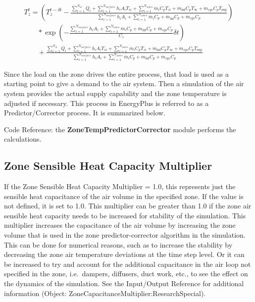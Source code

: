 \begin{equation}
\begin{array}{l}T_z^t = \left( {T_z^{t - \delta t} - \frac{{\sum\limits_{i = 1}^{{N_{sl}}} {{{\dot Q}_i}}  + \sum\limits_{i = 1}^{{N_{surfaces}}} {{h_i}} {A_i}{T_{si}} + \sum\limits_{i = 1}^{{N_{zones}}} {{{\dot m}_i}} {C_p}{T_{zi}} + {{\dot m}_{\inf }}{C_p}{T_\infty } + {{\dot m}_{sys}}{C_p}{T_{\sup }}}}{{\sum\limits_{i = 1}^{{N_{surfaces}}} {{h_i}} {A_i} + \sum\limits_{i = 1}^{{N_{zones}}} {{{\dot m}_i}} {C_p} + {{\dot m}_{\inf }}{C_p} + {{\dot m}_{sys}}{C_p}}}} \right)\\\;\;\;\;\;\;\;*\exp \left( { - \frac{{\sum\limits_{i = 1}^{{N_{surfaces}}} {{h_i}} {A_i} + \sum\limits_{i = 1}^{{N_{zones}}} {{{\dot m}_i}} {C_p} + {{\dot m}_{\inf }}{C_p} + {{\dot m}_{sys}}{C_p}}}{{{C_z}}}\delta t} \right)\\\;\;\;\;\;\;\; + \frac{{\sum\limits_{i = 1}^{{N_{sl}}} {{{\dot Q}_i}}  + \sum\limits_{i = 1}^{{N_{surfaces}}} {{h_i}} {A_i}{T_{si}} + \sum\limits_{i = 1}^{{N_{zones}}} {{{\dot m}_i}} {C_p}{T_{zi}} + {{\dot m}_{\inf }}{C_p}{T_\infty } + {{\dot m}_{sys}}{C_p}{T_{\sup }}}}{{\sum\limits_{i = 1}^{{N_{surfaces}}} {{h_i}} {A_i} + \sum\limits_{i = 1}^{{N_{zones}}} {{{\dot m}_i}} {C_p} + {{\dot m}_{\inf }}{C_p} + {{\dot m}_{sys}}{C_p}}}\end{array}
\end{equation}

Since the load on the zone drives the entire process, that load is used as a starting point to give a demand to the air system. Then a simulation of the air system provides the actual supply capability and the zone temperature is adjusted if necessary. This process in EnergyPlus is referred to as a Predictor/Corrector process. It is summarized below.

Code Reference: the \textbf{ZoneTempPredictorCorrector} module performs the calculations.

\subsection{Zone Sensible Heat Capacity Multiplier}\label{zone-sensible-heat-capacity-multiplier}

If the Zone Sensible Heat Capacity Multiplier = 1.0, this represents just the sensible heat capacitance of the air volume in the specified zone. If the value is not defined, it is set to 1.0. This multiplier can be greater than 1.0 if the zone air sensible heat capacity needs to be increased for stability of the simulation. This multiplier increases the capacitance of the air volume by increasing the zone volume that is used in the zone predictor-corrector algorithm in the simulation. This can be done for numerical reasons, such as to increase the stability by decreasing the zone air temperature deviations at the time step level. Or it can be increased to try and account for the additional capacitance in the air loop not specified in the zone, i.e.~dampers, diffusers, duct work, etc., to see the effect on the dynamics of the simulation. See the Input/Output Reference for additional information (Object: ZoneCapacitanceMultiplier:ResearchSpecial).

